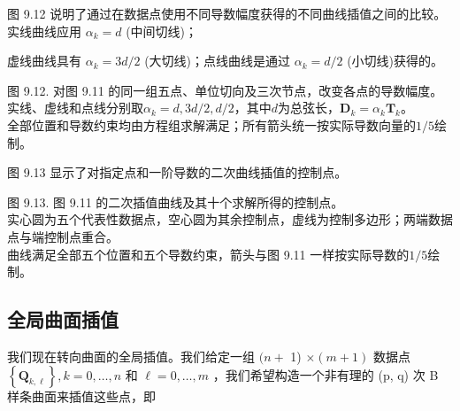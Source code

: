 \documentclass[../main.tex]{subfiles}
\begin{document}
图 9.12 说明了通过在数据点使用不同导数幅度获得的不同曲线插值之间的比较。实线曲线应用 \({\alpha }_{k} = d\) (中间切线)；



虚线曲线具有 \({\alpha }_{k} = 3d/2\) (大切线)；点线曲线是通过 \({\alpha }_{k} = d/2\) (小切线)获得的。

\begin{center}
\begin{minipage}{27cm}
\vspace*{.6\baselineskip}
\centering
{}
\par\smallskip
图 9.12. 对图 9.11 的同一组五点、单位切向及三次节点，改变各点的导数幅度。\\
实线、虚线和点线分别取$\alpha_k=d,3d/2,d/2$，其中$d$为总弦长，$\mathbf D_k=\alpha_k\mathbf T_k$。\\
全部位置和导数约束均由方程组求解满足；所有箭头统一按实际导数向量的$1/5$绘制。
\end{minipage}
\end{center}

图 9.13 显示了对指定点和一阶导数的二次曲线插值的控制点。





\begin{center}
\begin{minipage}{27cm}
\vspace*{.6\baselineskip}
\centering
{}
\par\smallskip
图 9.13. 图 9.11 的二次插值曲线及其十个求解所得的控制点。\\
实心圆为五个代表性数据点，空心圆为其余控制点，虚线为控制多边形；两端数据点与端控制点重合。\\
曲线满足全部五个位置和五个导数约束，箭头与图 9.11 一样按实际导数的$1/5$绘制。
\end{minipage}
\end{center}

\subsection{全局曲面插值}

我们现在转向曲面的全局插值。我们给定一组 \((n +\) 1) \(\times  \left( {m + 1}\right)\) 数据点 \(\left\{  {\mathbf{Q}}_{k,\ell }\right\}  ,k = 0,\ldots ,n\) 和 \(\ell  = 0,\ldots ,m\) ，我们希望构造一个非有理的 (p, q) 次 B 样条曲面来插值这些点，即
\end{document}
